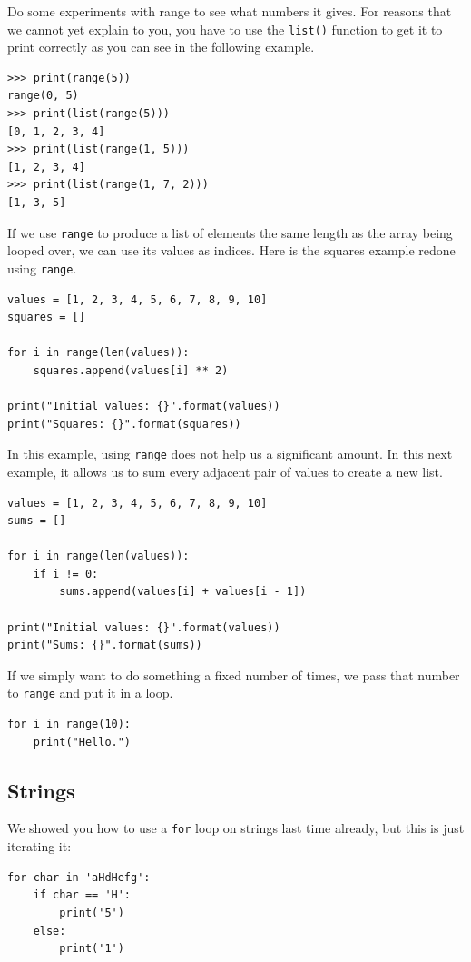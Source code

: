\documentclass[11pt]{cselabheader}
\begin{document}
Do some experiments with range to see what numbers it gives. For reasons that we
cannot yet explain to you, you have to use the \lstinline!list()! function to
get it to print correctly as you can see in the following example.
\begin{lstlisting}[style=ipython]
>>> print(range(5))
range(0, 5)
>>> print(list(range(5)))
[0, 1, 2, 3, 4]
>>> print(list(range(1, 5)))
[1, 2, 3, 4]
>>> print(list(range(1, 7, 2)))
[1, 3, 5]
\end{lstlisting}

If we use \lstinline{range} to produce a list of elements the same length as the
array being looped over, we can use its values as indices. Here is the squares
example redone using \lstinline{range}.

\begin{lstlisting}[style=python]
values = [1, 2, 3, 4, 5, 6, 7, 8, 9, 10]
squares = []

for i in range(len(values)):
    squares.append(values[i] ** 2)

print("Initial values: {}".format(values))
print("Squares: {}".format(squares))
\end{lstlisting}

In this example, using \lstinline{range} does not help us a significant amount.
In this next example, it allows us to sum every adjacent pair of values to
create a new list.

\begin{lstlisting}[style=python]
values = [1, 2, 3, 4, 5, 6, 7, 8, 9, 10]
sums = []

for i in range(len(values)):
    if i != 0:
        sums.append(values[i] + values[i - 1])

print("Initial values: {}".format(values))
print("Sums: {}".format(sums))
\end{lstlisting}

If we simply want to do something a fixed number of times, we pass that number
to \lstinline{range} and put it in a loop.

\begin{lstlisting}[style=python]
for i in range(10):
    print("Hello.")
\end{lstlisting}

\subsection{Strings}

We showed you how to use a \lstinline!for! loop on strings last time already,
but this is just iterating it:
\begin{lstlisting}
for char in 'aHdHefg':
    if char == 'H':
        print('5')
    else:
        print('1')
\end{lstlisting}
\end{document}
